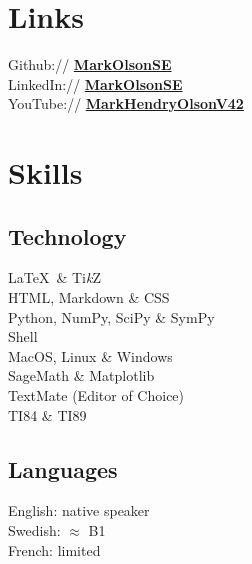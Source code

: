 \documentclass[a4paper]{deedy-resume}
\newcommand{\cvblue}[1]{{\color{cvblue}{#1}}}
\newcommand{\itemit}{\cvblue{$\odot$ \,}}
\newcommand{\TikZ}{Ti\textit{k}Z\xspace}
\begin{document}
\begin{minipage}[t]{0.33\textwidth}

\section{Links} 
Github:// \href{https://github.com/markolsonse}{\bf MarkOlsonSE} \\
LinkedIn://  \href{https://www.linkedin.com/in/MarkOlsonSE}{\bf MarkOlsonSE} \\
YouTube://  \href{https://www.youtube.com/c/MarkHendryOlsonV42}{\bf MarkHendryOlsonV42} 



\section{Skills}
\subsection{Technology}
\itemit \LaTeX\ \& \TikZ \\
\itemit HTML, Markdown \& CSS \\ 
\itemit Python, NumPy, SciPy \& SymPy \\
\itemit Shell \\ 

\itemit MacOS, Linux \& Windows \\
\itemit SageMath \& Matplotlib \\
\itemit TextMate (Editor of Choice)\\

\itemit TI84 \& TI89
\sectionsep

\subsection{Languages}
\itemit English: native speaker\\
\itemit Swedish: $\approx$ B1\\
\itemit French: limited
\sectionsep

%
%

\end{minipage} 
\hfill
\end{document}
